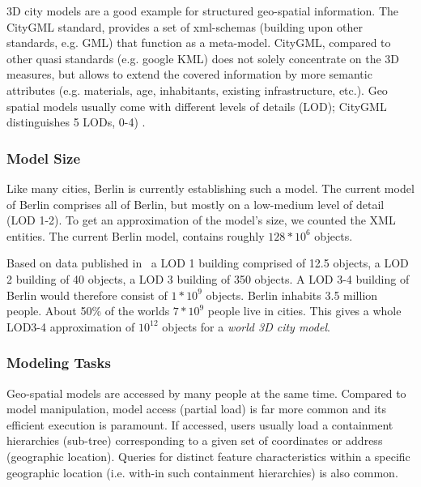 3D city models are a good example for structured geo-spatial information. The CityGML standard, provides a set of xml-schemas (building upon other standards, e.g. GML) that function as a meta-model. CityGML, compared to other quasi standards (e.g. google KML) does not solely concentrate on the 3D measures, but allows to extend the covered information by more semantic attributes (e.g. materials, age, inhabitants, existing infrastructure, etc.). Geo spatial models usually come with different levels of details (LOD); CityGML distinguishes 5 LODs, 0-4) . 

\subsubsection{Model Size}
Like many cities, Berlin is currently establishing such a model. The current model of Berlin comprises all of Berlin, but mostly on a low-medium level of detail (LOD 1-2). To get an approximation of the model's size, we counted the XML entities. The current Berlin model, contains roughly $128*10^6$ objects. 

Based on data published in~\cite{CityGMLBerlinDB} a LOD 1 building comprised of 12.5 objects, a LOD 2 building of 40 objects, a LOD 3 building of 350 objects. A LOD 3-4 building of Berlin would therefore consist of $1*10^9$ objects. Berlin inhabits 3.5 million people. About 50\% of the worlds $7*10^9$ people live in cities. This gives a whole LOD3-4 approximation of $10^{12}$ objects for a \emph{world 3D city model}.

\subsubsection{Modeling Tasks}
Geo-spatial models are accessed by many people at the same time. Compared to model manipulation, model access (partial load) is far more common and its efficient execution is paramount. If accessed, users usually load a containment hierarchies (sub-tree) corresponding to a given set of coordinates or address (geographic location). Queries for distinct feature characteristics within a specific geographic location (i.e. with-in such containment hierarchies) is also common. 



